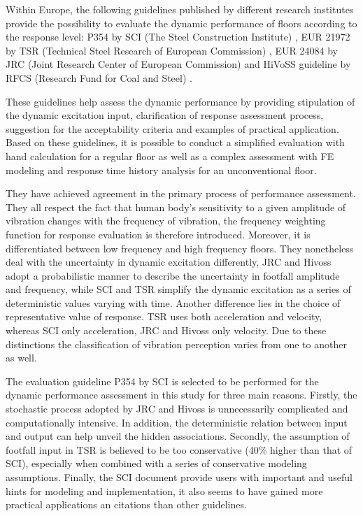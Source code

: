 Within Europe, the following guidelines published by different research institutes provide the possibility to evaluate the dynamic performance of floors according to the response level: P354 by SCI (The Steel Construction Institute) \cite{smith2007design}, EUR 21972 by TSR (Technical Steel Research of European Commission) \cite{sedlacek2006generalisation}, EUR 24084 by JRC (Joint Research Center of European Commission) \cite{feldmann2009design} and HiVoSS guideline by RFCS (Research Fund for Coal and Steel) \cite{feldmann2010human}. 

These guidelines help assess the dynamic performance by providing stipulation of the dynamic excitation input, clarification of response assessment process, suggestion for the acceptability criteria and examples of practical application. Based on these guidelines, it is possible to conduct a simplified evaluation with hand calculation for a regular floor as well as a complex assessment with FE modeling and response time history analysis for an unconventional floor.

They have achieved agreement in the primary process of performance assessment. They all respect the fact that human body's sensitivity to a given amplitude of vibration changes with the frequency of vibration, the frequency weighting function for response evaluation is therefore introduced. Moreover, it is differentiated between low frequency and high frequency floors. They nonetheless deal with the uncertainty in dynamic excitation differently, JRC and Hivoss adopt a probabilistic manner to describe the uncertainty in footfall amplitude and frequency, while SCI and TSR simplify the dynamic excitation as a series of deterministic values varying with time. Another difference lies in the choice of representative value of response. TSR uses both acceleration and velocity, whereas SCI only acceleration, JRC and Hivoss only velocity. Due to these distinctions the classification of vibration perception varies from one to another as well.

The evaluation guideline P354 by SCI is selected to be performed for the dynamic performance assessment in this study for three main reasons. Firstly, the stochastic process adopted by JRC and Hivoss is unnecessarily complicated and computationally intensive. In addition, the deterministic relation between input and output can help unveil the hidden associations. Secondly, the assumption of footfall input in TSR is believed to be too conservative (40\% higher than that of SCI), especially when combined with a series of conservative modeling assumptions. Finally, the SCI document provide users with important and useful hints for modeling and implementation, it also seems to have gained more practical applications an citations than other guidelines.


